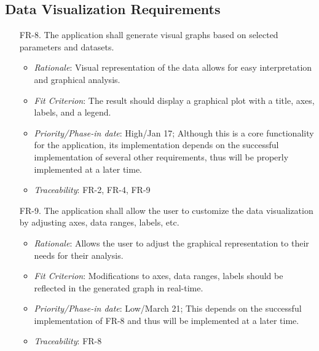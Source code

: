 \documentclass[12pt]{article}
\begin{document}
\subsection{Data Visualization Requirements}
\begin{enumerate}
  \item[FR-8.] The application shall generate visual graphs based on selected parameters and datasets.
  \begin{itemize}
    \item \textit{Rationale}: Visual representation of the data allows for easy interpretation and graphical analysis.
    \item \textit{Fit Criterion}: The result should display a graphical plot with a title, axes, labels, and a legend.
    \item \textit{Priority/Phase-in date}: High/Jan 17; Although this is a core functionality for the application, its implementation depends on the successful implementation of several other requirements, thus will be properly implemented at a later time.
    \item \textit{Traceability}: FR-2, FR-4, FR-9
  \end{itemize}
  \item[FR-9.] The application shall allow the user to customize the data visualization by adjusting axes, data ranges, labels, etc.
  \begin{itemize}
    \item \textit{Rationale}: Allows the user to adjust the graphical representation to their needs for their analysis.
    \item \textit{Fit Criterion}: Modifications to axes, data ranges, labels should be reflected in the generated graph in real-time.
    \item \textit{Priority/Phase-in date}: Low/March 21; This depends on the successful implementation of FR-8 and thus will be implemented at a later time.
    \item \textit{Traceability}: FR-8
  \end{itemize}
\end{enumerate}
\end{document}
